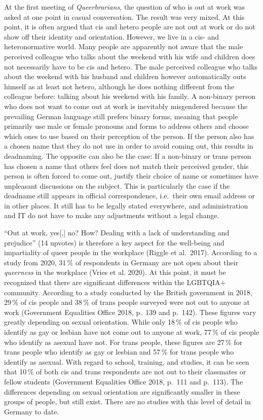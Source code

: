 \documentclass[a4paper,
fontsize=11pt,
oneside,
numbers=noperiodatend,
parskip=half-,
bibliography=totoc,
final
]{scrartcl}
\begin{document}
At the first meeting of \emph{Queerbrarians,} the question of who is out
at work was asked at one point in casual conversation. The result was
very mixed. At this point, it is often argued that cis and hetero people
are not out at work or do not show off their identity and orientation.
However, we live in a cis- and heteronormative world. Many people are
apparently not aware that the male perceived colleague who talks about
the weekend with his wife and children does not necessarily have to be
cis and hetero. The male perceived colleague who talks about the weekend
with his husband and children however automatically outs himself as at
least not hetero, although he does nothing different from the colleague
before: talking about his weekend with his family. A non-binary person
who does not want to come out at work is inevitably misgendered because
the prevailing German language still prefers binary forms, meaning that
people primarily use male or female pronouns and forms to address others
and choose which ones to use based on their perception of the person. If
the person also has a chosen name that they do not use in order to avoid
coming out, this results in deadnaming. The opposite can also be the
case: If a non-binary or trans person has chosen a name that others feel
does not match their perceived gender, this person is often forced to
come out, justify their choice of name or sometimes have unpleasant
discussions on the subject. This is particularly the case if the
deadname still appears in official correspondence, i.e.~their own email
address or in other places. It still has to be legally stated
everywhere, and administration and IT do not have to make any
adjustments without a legal change.

\enquote{Out at work, yes{[},{]} no? How? Dealing with a lack of understanding
and prejudice} (14 upvotes) is therefore a key aspect for the well-being
and impartiality of queer people in the workplace (Riggle et al.~2017).
According to a study from 2020, 31\,\% of respondents in Germany are not
open about their \emph{queerness} in the workplace (Vries et al. 2020).
At this point, it must be recognized that there are significant
differences within the LGBTQIA+ community. According to a study
conducted by the British government in 2018, 29\,\% of cis people and 38\,\%
of trans people surveyed were not out to anyone at work (Government
Equalities Office 2018, p.~139 and p.~142). These figures vary greatly
depending on sexual orientation. While only 18\,\% of cis people who
identify as gay or lesbian have not come out to anyone at work, 77\,\% of
cis people who identify as asexual have not. For trans people, these
figures are 27\,\% for trans people who identify as gay or lesbian and
57\,\% for trans people who identify as asexual. With regard to school,
training, and studies, it can be seen that 10\,\% of both cis and trans
respondents are not out to their classmates or fellow students
(Government Equalities Office 2018, p.~111 and p.~113). The differences
depending on sexual orientation are significantly smaller in these
groups of people, but still exist. There are no studies with this level
of detail in Germany to date.
\end{document}
